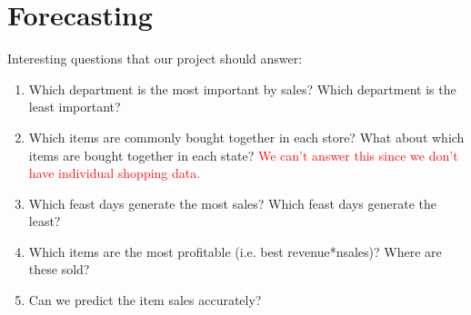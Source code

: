 \documentclass[12pt]{article}
\begin{document}
\clearpage
\section{Forecasting}


\clearpage
Interesting questions that our project should answer:
\begin{enumerate}
    \item Which department is the most important by sales? Which department is the least important?
    \item Which items are commonly bought together in each store? What about which items are bought together in each state? \textcolor{red}{We can't answer this since we don't have individual shopping data.}
    \item Which feast days generate the most sales? Which feast days generate the least?
    \item Which items are the most profitable (i.e. best revenue*nsales)? Where are these sold?
    \item Can we predict the item sales accurately?
\end{enumerate}
\end{document}
